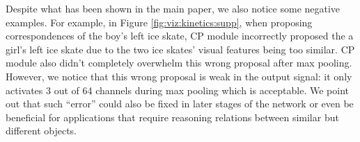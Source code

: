 \documentclass[10pt,twocolumn,letterpaper]{article}
\begin{document}
Despite what has been shown in the main paper, we also notice some negative examples. For example, in Figure \ref{fig:viz:kinetics:supp}, when proposing correspondences of the boy's left ice skate, CP module incorrectly proposed the a girl's left ice skate due to the two ice skates' visual features being too similar. CP module also didn't completely overwhelm this wrong proposal after max pooling. 
However, we notice that this wrong proposal is weak in the output signal: it only activates 3 out of 64 channels during max pooling which is acceptable.
We point out that such ``error'' could also be fixed in later stages of the network or even be beneficial for applications that require reasoning relations between similar but different objects. 


\begin{figure*}[h]
\captionsetup{position=bottom}
\centering
{} 
\\
\\
\caption{Additional Visualization on our final models on Kinetics dataset. Approach is the same as the main paper.} 
\label{fig:viz:kinetics:supp}
\end{figure*}
\end{document}

